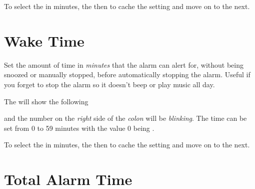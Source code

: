To select the  in minutes,  the  then 
to cache the setting and move on to the next.


\section{Wake Time} 

Set the amount of time in \textit{minutes} that the alarm can alert for, without
being snoozed or manually stopped, before automatically stopping the alarm.
Useful if you forget to stop the alarm so it doesn't beep or play music all day.


The  will show the following


and the number on the \textit{right} side of the \textit{colon} will be
\textit{blinking}.  The time can be set from
\num{0} to \num{59} minutes with the value \num{0} being .

\par\medskip

To select the  in minutes,  the  then 
to cache the setting and move on to the next.


\section{Total Alarm Time} 

